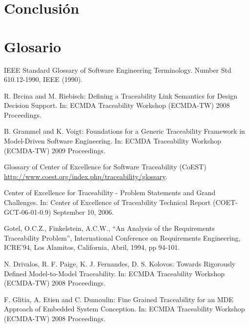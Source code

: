 \documentclass[a4paper,12pt,oneside]{book}
\begin{document}
\backmatter

\chapter{Conclusión}


\chapter{Glosario}


\begin{thebibliography}{99}


 IEEE Standard Glossary of Software Engineering Terminology. Number Std 610.12-1990, IEEE (1990).

 R. Brcina and M. Riebisch: Defining a Traceability Link Semantics for Design Decision Support. In: ECMDA Traceability Workshop (ECMDA-TW) 2008 Proceedings.

 B. Grammel and K. Voigt: Foundations for a Generic Traceability Framework in Model-Driven Software Engineering. In: ECMDA Traceability Workshop (ECMDA-TW) 2009 Proceedings.

 Glossary of Center of  Excellence for Software Traceability (CoEST) \url{http://www.coest.org/index.php/traceability/glossary}.

 Center of Excellence for Traceability - Problem Statements and Grand Challenges. In: Center of Excellence of Traceability Technical Report (COET-GCT-06-01-0.9) September 10, 2006.

 Gotel, O.C.Z., Finkelstein, A.C.W., “An Analysis of the Requirements Traceability Problem”, International Conference on Requirements Engineering, ICRE’94, Los Alamitos, California, Abril, 1994, pp 94-101.

 N. Drivalos, R. F. Paige, K. J. Fernandes, D. S. Kolovos: Towards Rigorously Defined Model-to-Model Traceability. In: ECMDA Traceability Workshop (ECMDA-TW) 2008 Proceedings.

 F. Glitia, A. Etien and C. Dumoulin: Fine Grained Traceability for an MDE Approach of Embedded System Conception. In: ECMDA Traceability Workshop (ECMDA-TW) 2008 Proceedings.


\end{thebibliography}
\end{document}
